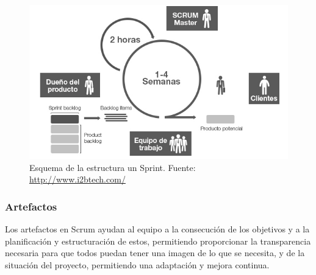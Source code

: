 \begin{figure}[!h]
\begin{center}
\includegraphics[width=1\textwidth]{./figures/scrum-framework.jpg}
\caption[Esquema de la estructura un Sprint]{Esquema de la estructura un Sprint. Fuente: \href{http://www.i2btech.com/}{http://www.i2btech.com/}}
\label{fig:scrum-framework}
\end{center}
\end{figure}

\subsubsection{Artefactos}

Los artefactos en Scrum ayudan al equipo a la consecución de los objetivos y a la planificación y estructuración de estos, permitiendo proporcionar la transparencia necesaria para que todos puedan tener una imagen de lo que se necesita, y de la situación del proyecto, permitiendo una adaptación y mejora continua.

